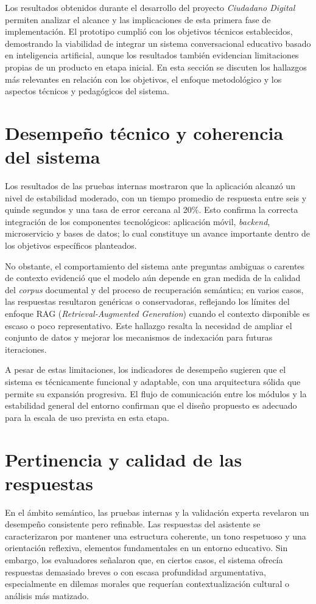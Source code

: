 Los resultados obtenidos durante el desarrollo del proyecto \textit{Ciudadano
    Digital} permiten analizar el alcance y las implicaciones de esta primera fase
de implementación. El prototipo cumplió con los objetivos técnicos
establecidos, demostrando la viabilidad de integrar un sistema conversacional
educativo basado en inteligencia artificial, aunque los resultados también
evidencian limitaciones propias de un producto en etapa inicial. En esta
sección se discuten los hallazgos más relevantes en relación con los objetivos,
el enfoque metodológico y los aspectos técnicos y pedagógicos del sistema.

\section{Desempeño técnico y coherencia del sistema}
Los resultados de las pruebas internas mostraron que la aplicación alcanzó un
nivel de estabilidad moderado, con un tiempo promedio de respuesta entre seis y
quinde segundos y una tasa de error cercana al 20\%. Esto confirma la correcta
integración de los componentes tecnológicos: aplicación móvil,
\textit{backend}, microservicio y bases de datos; lo cual constituye un avance
importante dentro de los objetivos específicos planteados.

No obstante, el comportamiento del sistema ante preguntas ambiguas o carentes
de contexto evidenció que el modelo aún depende en gran medida de la calidad
del \textit{corpus} documental y del proceso de recuperación semántica; en
varios casos, las respuestas resultaron genéricas o conservadoras, reflejando
los límites del enfoque RAG (\textit{Retrieval-Augmented Generation}) cuando el
contexto disponible es escaso o poco representativo. Este hallazgo resalta la
necesidad de ampliar el conjunto de datos y mejorar los mecanismos de
indexación para futuras iteraciones.

A pesar de estas limitaciones, los indicadores de desempeño sugieren que el
sistema es técnicamente funcional y adaptable, con una arquitectura sólida que
permite su expansión progresiva. El flujo de comunicación entre los módulos y
la estabilidad general del entorno confirman que el diseño propuesto es
adecuado para la escala de uso prevista en esta etapa.

\section{Pertinencia y calidad de las respuestas}
En el ámbito semántico, las pruebas internas y la validación experta revelaron
un desempeño consistente pero refinable. Las respuestas del asistente se
caracterizaron por mantener una estructura coherente, un tono respetuoso y una
orientación reflexiva, elementos fundamentales en un entorno educativo. Sin
embargo, los evaluadores señalaron que, en ciertos casos, el sistema ofrecía
respuestas demasiado breves o con escasa profundidad argumentativa,
especialmente en dilemas morales que requerían contextualización cultural o
análisis más matizado.

